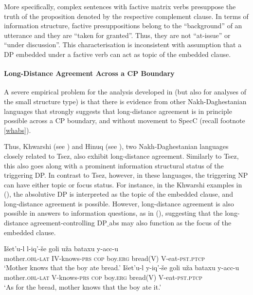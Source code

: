 \documentclass[output=paper
,modfonts
,nonflat]{langsci/langscibook}
\begin{document}
More specifically, complex sentences with factive matrix verbs
presuppose the truth of the proposition denoted by the respective
complement clause. In terms of information structure, factive
presuppositions belong to the ``background'' of an utterance and they
are ``taken for granted''. Thus, they are not ``at-issue'' or ``under
discussion''. This characterisation is inconsistent with
 assumption that a DP embedded under a factive verb
can act as topic of the embedded clause.

\paragraph{Long-Distance Agreement Across a CP Boundary}

A severe empirical problem for the analysis developed in
\cite{Polinsky&Potsdam:01} (but also for analyses of the small
structure type) is that there is evidence from other Nakh-Daghestanian
languages that strongly suggests that long-distance agreement is in
principle possible across a CP boundary, and without movement to SpecC
(recall footnote \ref{whabs}). 

Thus, Khwarshi (see
\cite{Khalilova09}) and Hinuq (see \cite{Forker:11}), two
Nakh-Daghe\-stanian languages closely related to Tsez,
 also exhibit long-distance agreement. Similarly to Tsez, this
also goes along with a prominent information structural status of the
triggering DP. In contrast to Tsez, however, in these languages, the
triggering NP can have either topic or focus status.
For instance, in the Khwarshi examples in (\Next), the 
absolutive DP is interpreted as the topic of the embedded clause, and
long-distance agreement is possible.
However, long-distance agreement is also possible in answers to
information questions, as in (\NNext), suggesting that the
long-distance agreement-controlling DP$\_${abs} may also function as the focus of the embedded clause.

\ea\label{ex:mueller:16}
\ea
\gll I\v{s}et'u-l l-iq'-\v{s}e goli u\v{z}a bataxu y-acc-u \\
 mother.{\scshape obl-lat} IV-knows-{\scshape prs} {\scshape cop} boy.{\scshape erg} bread(V) V-eat-{\scshape pst.ptcp} \\
\glt `Mother knows that the boy ate bread.'
\ex  
\gll I\v{s}et'u-l \label{16-b}y-iq'-\v{s}e goli u\v{z}a bataxu y-acc-u \\
  mother.{\scshape obl-lat} V-knows-{\scshape prs} {\scshape cop} boy.{\scshape erg}  bread(V) V-eat-{\scshape pst.ptcp} \\
\glt `As for the bread, mother knows that  the boy ate it.'
\z
\z
\end{document}
